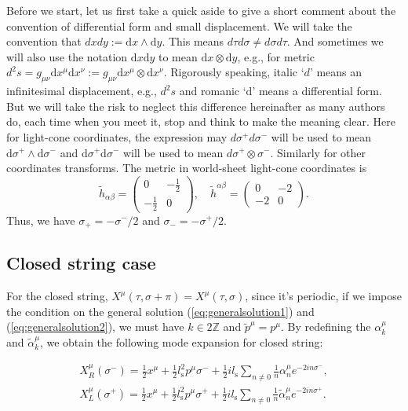 \documentclass[graybox,envcountchap,sectrefs]{svmono}
\begin{document}
Before we start, let us first take a quick aside to give a short comment about the convention of differential form and small displacement.
 We will take the convention that ${d}x{d}y:=\mathrm{d}x\wedge \mathrm{d}y$.
This means ${d}\tau {d}\sigma\neq {d}\sigma {d}\tau$. And sometimes we will also use the notation $\mathrm{d}x\mathrm{d}y$ to mean $\mathrm{d}x\otimes \mathrm{d}y$, e.g., for metric $d^2s=g_{\mu\nu}\mathrm{d}x^{\mu}\mathrm{d}x^{\nu}:=g_{\mu\nu}\mathrm{d}x^{\mu}\otimes\mathrm{d} x^{\nu}$.
Rigorously speaking, italic `$d$' means an infinitesimal displacement, 
e.g., $d^2s$
and romanic `$\mathrm{d}$' means a differential form. But we will take the risk to neglect this difference hereinafter as many authors do, each time when you meet it, stop and think to make the meaning clear. 
Here for light-cone coordinates, the expression may $d\sigma^+d\sigma^-$ will be used to mean $\mathrm{d}\sigma^+\wedge \mathrm{d}\sigma^-$ and $\mathrm{d}\sigma^+\mathrm{d}\sigma^-$ will be used to mean $d\sigma^+\otimes\sigma^-$. Similarly for other coordinates transforms.
The metric in world-sheet light-cone coordinates is
\begin{equation}
\tilde{h}_{\alpha\beta}=\left(\begin{array}{cc}
0 & -\frac{1}{2}\\
-\frac{1}{2} & 0
\end{array}	\right),\quad  \tilde{h}^{\alpha\beta}=\left(\begin{array}{cc}
0 & -{2}\\
-{2} & 0
\end{array}	\right).
\end{equation}
Thus, we have $\sigma_+=-\sigma^-/2$ and $\sigma_-=-\sigma^+/2$.


\subsection{Closed string case}
For the closed string, $X^{\mu}(\tau,\sigma+\pi)=X^{\mu}(\tau,\sigma)$, since it's periodic, if we impose the condition on the general solution (\ref{eq:generalsolution1}) and (\ref{eq:generalsolution2}), we must have $k\in 2\mathbb{Z}$ and $\tilde{p}^{\mu}=p^{\mu}$. By redefining the $\alpha_k^{\mu}$ and $\tilde{\alpha}_k^{\mu}$, we obtain the following mode expansion for closed string:
\begin{svgraybox}
\begin{align} 
X_{R}^{\mu}(\sigma^-)=\frac{1}{2}x^{\mu}+\frac{1}{2}l_{\mathrm{s}}^2p^{\mu}\sigma^{-}+\frac{1}{2}il_{\mathrm{s}}\sum_{n\neq 0}\frac{1}{n}\alpha_{n}^{\mu}e^{-2in\sigma^{-}},\label{eq:mxpR}\\
X_{L}^{\mu}(\sigma^+)=\frac{1}{2}x^{\mu}+\frac{1}{2}l_{\mathrm{s}}^2p^{\mu}\sigma^{+}+\frac{1}{2}il_{\mathrm{s}}\sum_{n\neq 0}\frac{1}{n}\tilde{\alpha}_{n}^{\mu}e^{-2in\sigma^{+}}. \label{eq:mxpL}
\end{align}
\end{svgraybox}
\end{document}
